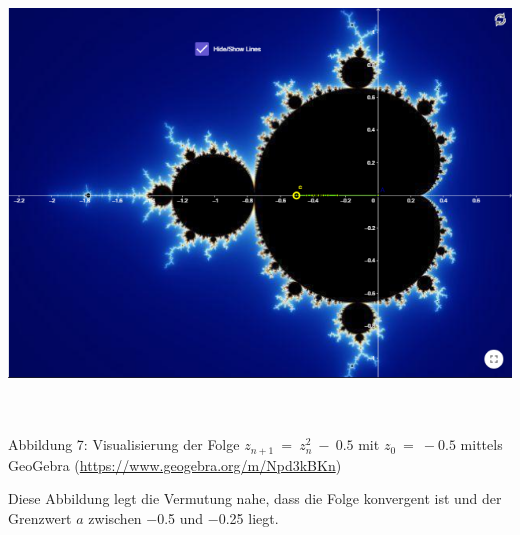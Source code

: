 \documentclass[a4paper, 12pt]{book}
\begin{document}
\includegraphics[width=6.33858in,height=4.65409in]{image12.png}

\protect\hypertarget{_Toc167901657}{}{}Abbildung 7: Visualisierung der
Folge \(z_{n + 1}\  = \ z_{n}^{2}\  - \ 0.5\) mit \(z_{0}\  = \  - 0.5\)
mittels GeoGebra (\url{https://www.geogebra.org/m/Npd3kBKn})

Diese Abbildung legt die Vermutung nahe, dass die Folge konvergent ist
und der Grenzwert \(a\) zwischen \(-\)0.5 und \(-\)0.25 liegt.
\end{document}
